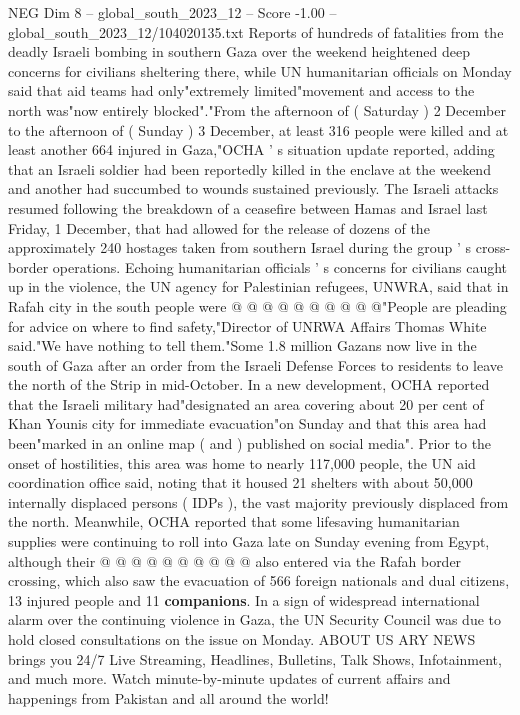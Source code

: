 \begin{textsample}{NEG Dim 8 – global\_south\_2023\_12 – Score -1.00 – global\_south\_2023\_12/104020135.txt}  \label{ex:f8_neg_225}
Reports of hundreds of fatalities from the deadly Israeli bombing in southern Gaza over the weekend heightened deep concerns for civilians sheltering there, while UN humanitarian officials on Monday said that aid teams had only"extremely limited"movement and access to the north was"now entirely blocked"."From the afternoon of ( Saturday ) 2 December to the afternoon of ( Sunday ) 3 December, at least 316 people were killed and at least another 664 injured in Gaza,"OCHA ' s situation update reported, adding that an Israeli soldier had been reportedly killed in the enclave at the weekend and another had succumbed to wounds sustained previously.
The Israeli attacks resumed following the breakdown of a ceasefire between Hamas and Israel last Friday, 1 December, that had allowed for the release of dozens of the approximately 240 hostages taken from southern Israel during the group ' s cross-border operations.
Echoing humanitarian officials ' s concerns for civilians caught up in the violence, the UN agency for Palestinian refugees, UNWRA, said that in Rafah city in the south people were @ @ @ @ @ @ @ @ @ @"People are pleading for advice on where to find safety,"Director of UNRWA Affairs Thomas White said."We have nothing to tell them."Some 1.8 million Gazans now live in the south of Gaza after an order from the Israeli Defense Forces to residents to leave the north of the Strip in mid-October.
In a new development, OCHA reported that the Israeli military had"designated an area covering about 20 per cent of Khan Younis city for immediate evacuation"on Sunday and that this area had been"marked in an online map ( and ) published on social media".
Prior to the onset of hostilities, this area was home to nearly 117,000 people, the UN aid coordination office said, noting that it housed 21 shelters with about 50,000 internally displaced persons ( IDPs ), the vast majority previously displaced from the north.
Meanwhile, OCHA reported that some lifesaving humanitarian supplies were continuing to roll into Gaza late on Sunday evening from Egypt, although their @ @ @ @ @ @ @ @ @ @ also entered via the Rafah border crossing, which also saw the evacuation of 566 foreign nationals and dual citizens, 13 injured people and 11 \textbf{companions}.
In a sign of widespread international alarm over the continuing violence in Gaza, the UN Security Council was due to hold closed consultations on the issue on Monday.
ABOUT US ARY NEWS brings you 24/7 Live Streaming, Headlines, Bulletins, Talk Shows, Infotainment, and much more.
Watch minute-by-minute updates of current affairs and happenings from Pakistan and all around the world!

\end{textsample}
